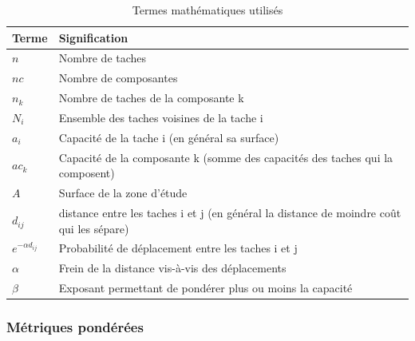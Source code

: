 \documentclass{article}
\begin{document}
\begin{table}[H]
\begin{tabular}{|m{3.24cm}|m{12.604cm}|}
\hline
Terme &
Signification\\\hline
$
n
$
 &
Nombre de taches\\\hline
$
\mathit{nc}
$
 &
Nombre de composantes\\\hline
$
{n}_{k}
$
 &
Nombre de taches de la composante k\\\hline
$
{N}_{i}
$
 &
Ensemble des taches voisines de la tache i\\\hline
$
{a}_{i}\text{~}
$
 &
Capacité de la tache i (en général sa surface)\\\hline
$
{\mathit{ac}}_{k}
$
 &
Capacité de la composante k (somme des capacités des taches qui la composent)\\\hline
$
A
$
 &
Surface de la zone d’étude\\\hline
$
{d}_{\mathit{ij}}\text{~}
$
 &
distance entre les taches i et j (en général la distance de moindre coût qui les sépare)\\\hline
$
{e}^{-\alpha {d}_{\mathit{ij}}}\text{~}
$
 &
Probabilité de déplacement entre les taches i et j\\\hline
$
\alpha 
$
 &
Frein de la distance vis-à-vis des déplacements\\\hline
$
\beta 
$
 &
Exposant permettant de pondérer plus ou moins la capacité\\\hline
\end{tabular}
\caption{Termes mathématiques utilisés}
\end{table}


\subsubsection{Métriques pondérées}
\end{document}
